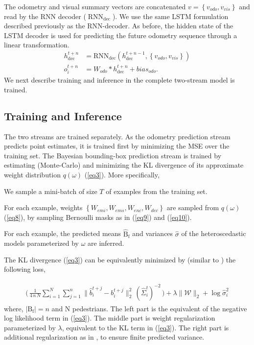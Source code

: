 The odometry and visual summary vectors  are concatenated $v = \left\{ v_{odo}, v_{vis}\right\}$ and read by the RNN decoder ($\operatorname{RNN}_{\text{dec}}$). We use the same LSTM formulation described previously as the RNN-decoder. As before, the hidden state of the LSTM decoder is used for predicting the future odometry sequence through a linear transformation.
\begin{align*}
    h_{\text{dec}}^{t+n} &= \text{RNN}_{\text{dec}}(h_{\text{dec}}^{t+n-1}, \left\{v_{odo},v_{vis}\right\}) \\ 
    o_{i}^{t+n} &= W_{odo} * h_{\text{dec}}^{t+n} + bias_{odo}.
\end{align*}
We next describe training and inference in the complete two-stream model is trained.

\subsection{Training and Inference}\label{ssec:cl} 
 The two streams are trained separately. As the odometry prediction stream predicts point estimates, it is trained first by minimizing the MSE over the training set. The Bayesian bounding-box prediction stream is trained by estimating (Monte-Carlo) and minimizing the KL divergence of its approximate weight distribution $q(\omega)$ (\ref{eq3}). More specifically, 
\begin{enumerate*}
    \item We sample a mini-batch of size $T$ of examples from the training set.
    \item For each example, weights $\left\{ W_{emi}, W_{ems}, W_{enc}, W_{dec} \right\}$ are sampled from $q(\omega)$ (\ref{eq8}), by sampling Bernoulli masks as in (\ref{eq9}) and (\ref{eq10}).
    \item For each example, the predicted means $\hat{\text{B}}_{\text{f}}$ and variances $\hat{\sigma}$ of the heteroscedastic models parameterized by $\omega$ are inferred.
    \item The KL divergence (\ref{eq3}) can be equivalently minimized by (similar to \cite{gal2016dropout,kendall2017uncertainties}) the following loss,
\end{enumerate*}
\begin{align*}
    \begin{split}
        \Big(\, \frac{1}{4 \, n \, N} \sum_{i=1}^{N} \sum_{j=1}^{n}  \lVert \hat{b}_{i}^{t+j} - b_{i}^{t+j} \lVert_{2}^{2} \, (\hat{\Sigma}_{i}^{t})^{-2} \, \Big) + \lambda \lVert \mathcal{W} \rVert_{2} + \log \hat{\sigma}_{i}^{2}
    \end{split}
\end{align*}
where, $\mid \text{B}_{\text{f}}\mid = n$ and N pedestrians. The left part is the equivalent of the negative log likelihood term in (\ref{eq3}). The middle part is weight regularization parameterized by $\lambda$, equivalent to the KL term in (\ref{eq3}). The right part is additional regularization as in \cite{kendall2017uncertainties}, to ensure finite predicted variance. 

